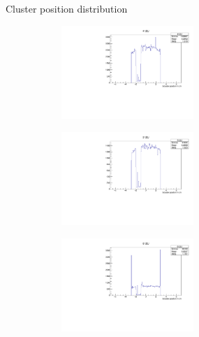 \documentclass[xcolor=dvipsnames]{beamer}
\begin{document}
\begin{frame} {Cluster position distribution}
	\begin{multicols}{2}
		\begin{figure}[H]
			\begin{center}			
				\begin{subfigure}[b]{0.40\textwidth}
					\includegraphics[width=5cm]{412U.pdf}
				\end{subfigure}						
			\end{center}
		\end{figure}
		\begin{figure}[H]
			\begin{center}			
				\begin{subfigure}[b]{0.40\textwidth}
					\includegraphics[width=5cm]{512U.pdf}
				\end{subfigure}				
			\end{center}
		\end{figure}
	\end{multicols} 
	\begin{multicols}{2}
		\begin{figure}[H]
			\begin{center}			
				\begin{subfigure}[b]{0.40\textwidth}
					\includegraphics[width=5cm]{612U.pdf}
				\end{subfigure}						

\end{center}
\end{figure}
\end{multicols}
\end{frame}
\end{document}
